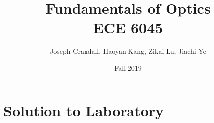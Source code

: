 

\usepackage{subfiles}
\usepackage{color,soul}
\usepackage{siunitx}
\usepackage{gensymb}

\title{Fundamentals of Optics\\
\large ECE 6045}
\author{Joseph Crandall, Haoyan Kang, Zikai Lu, Jiachi Ye}
\date{Fall 2019}


\maketitle
\section{Solution to Laboratory}




